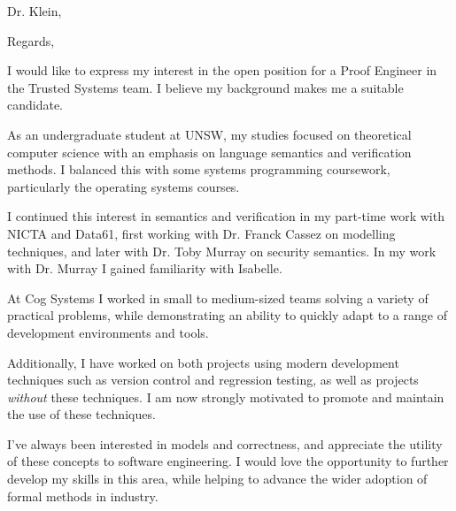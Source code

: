 \documentclass[11pt,a4paper]{moderncv}        %
\begin{document}
\date{\today}
\opening{Dr. Klein,}
\closing{Regards,}
\makelettertitle

I would like to express my interest in the open position for a Proof Engineer in the Trusted Systems team. I believe my background makes me a suitable candidate.

As an undergraduate student at UNSW, my studies focused on theoretical computer science with an emphasis on language semantics and verification methods. I balanced this with some systems programming coursework, particularly the operating systems courses.

I continued this interest in semantics and verification in my part-time work with NICTA and Data61, first working with Dr. Franck Cassez on modelling techniques, and later with Dr. Toby Murray on security semantics. In my work with Dr. Murray I gained familiarity with Isabelle.

At Cog Systems I worked in small to medium-sized teams solving a variety of practical problems, while demonstrating an ability to quickly adapt to a range of development environments and tools.

Additionally, I have worked on both projects using modern development techniques such as version control and regression testing, as well as projects \textit{without} these techniques. I am now strongly motivated to promote and maintain the use of these techniques.

I've always been interested in models and correctness, and appreciate the utility of these concepts to software engineering. I would love the opportunity to further develop my skills in this area, while helping to advance the wider adoption of formal methods in industry.

\makeletterclosing
\end{document}
